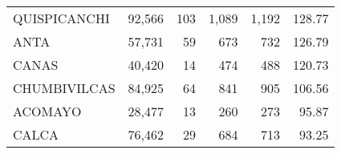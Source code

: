 \begin{tabular}{lrrrrr}
	\cellcolor[HTML]{FFFC9E}QUISPICANCHI                                               & 92,566                                                         & 103                                                      & 1,089                                                    & 1,192                                                               & 128.77                                                                       \\
	\cellcolor[HTML]{FFFC9E}ANTA                                                       & 57,731                                                         & 59                                                       & 673                                                      & 732                                                                 & 126.79                                                                       \\
	\cellcolor[HTML]{FFFC9E}CANAS                                                      & 40,420                                                         & 14                                                       & 474                                                      & 488                                                                 & 120.73                                                                       \\
	\cellcolor[HTML]{9AFF99}CHUMBIVILCAS                                               & 84,925                                                         & 64                                                       & 841                                                      & 905                                                                 & 106.56                                                                       \\
	\cellcolor[HTML]{9AFF99}ACOMAYO                                                    & 28,477                                                         & 13                                                       & 260                                                      & 273                                                                 & 95.87                                                                        \\
	\cellcolor[HTML]{9AFF99}CALCA                                                      & 76,462                                                         & 29                                                       & 684                                                      & 713                                                                 & 93.25                                                                        \\

\end{tabular}
